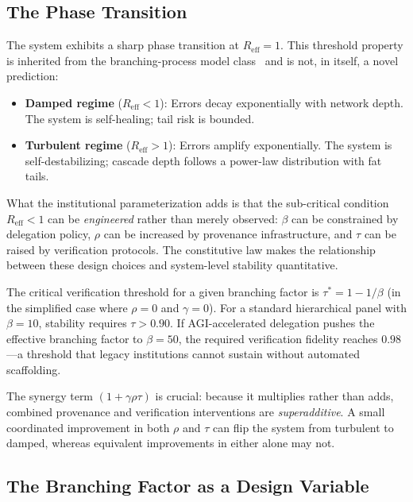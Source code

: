 \documentclass[runningheads]{llncs}
\begin{document}
\subsection{The Phase Transition}

The system exhibits a sharp phase transition at $R_{\mathrm{eff}} = 1$. This threshold property is inherited from the branching-process model class~\cite{anderson1991infectious,hethcote2000mathematics} and is not, in itself, a novel prediction:

\begin{itemize}
\item \textbf{Damped regime} ($R_{\mathrm{eff}} < 1$): Errors decay exponentially with network depth. The system is self-healing; tail risk is bounded.
\item \textbf{Turbulent regime} ($R_{\mathrm{eff}} > 1$): Errors amplify exponentially. The system is self-destabilizing; cascade depth follows a power-law distribution with fat tails.
\end{itemize}

What the institutional parameterization adds is that the sub-critical condition $R_{\mathrm{eff}} < 1$ can be \emph{engineered} rather than merely observed: $\beta$ can be constrained by delegation policy, $\rho$ can be increased by provenance infrastructure, and $\tau$ can be raised by verification protocols. The constitutive law makes the relationship between these design choices and system-level stability quantitative.

The critical verification threshold for a given branching factor is $\tau^* = 1 - 1/\beta$ (in the simplified case where $\rho = 0$ and $\gamma = 0$). For a standard hierarchical panel with $\beta = 10$, stability requires $\tau > 0.90$. If AGI-accelerated delegation pushes the effective branching factor to $\beta = 50$, the required verification fidelity reaches $0.98$---a threshold that legacy institutions cannot sustain without automated scaffolding.

The synergy term $(1 + \gamma \rho \tau)$ is crucial: because it multiplies rather than adds, combined provenance and verification interventions are \emph{superadditive}. A small coordinated improvement in both $\rho$ and $\tau$ can flip the system from turbulent to damped, whereas equivalent improvements in either alone may not.

\subsection{The Branching Factor as a Design Variable}
\end{document}
